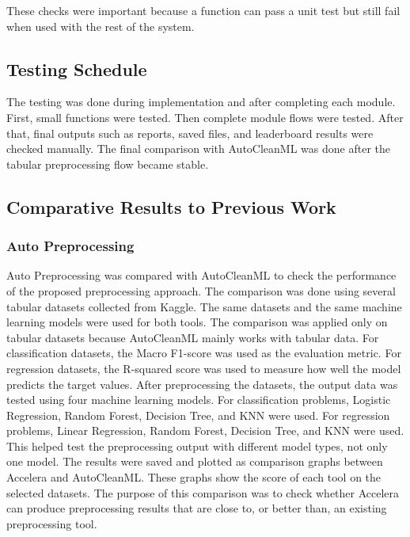 \documentclass[12pt,a4paper]{report}
\begin{document}
These checks were important because a function can pass a unit test but still
fail when used with the rest of the system.

\subsection{Testing Schedule}

The testing was done during implementation and after completing each module.
First, small functions were tested. Then complete module flows were tested.
After that, final outputs such as reports, saved files, and leaderboard results
were checked manually. The final comparison with AutoCleanML was done after the
tabular preprocessing flow became stable.

\subsection{Comparative Results to Previous Work}
\subsubsection{Auto Preprocessing}
Auto Preprocessing was compared with AutoCleanML to check the performance of the proposed preprocessing approach. The comparison was done using several tabular datasets collected from Kaggle. The same datasets and the same machine learning models were used for both tools.
The comparison was applied only on tabular datasets because AutoCleanML mainly works with tabular data. For classification datasets, the Macro F1-score was used as the evaluation metric. For regression datasets, the R-squared score was used to measure how well the model predicts the target values.
After preprocessing the datasets, the output data was tested using four machine learning models. For classification problems, Logistic Regression, Random Forest, Decision Tree, and KNN were used. For regression problems, Linear Regression, Random Forest, Decision Tree, and KNN were used. This helped test the preprocessing output with different model types, not only one model.
The results were saved and plotted as comparison graphs between Accelera and AutoCleanML. These graphs show the score of each tool on the selected datasets. The purpose of this comparison was to check whether Accelera can produce preprocessing results that are close to, or better than, an existing preprocessing tool.
\end{document}
